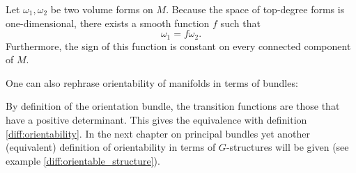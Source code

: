     \begin{property}
        Let $\omega_1,\omega_2$ be two volume forms on $M$. Because the space of top-degree forms is one-dimensional, there exists a smooth function $f$ such that \[\omega_1 = f\omega_2.\] Furthermore, the sign of this function is constant on every connected component of $M$.
    \end{property}

    One can also rephrase orientability of manifolds in terms of bundles:

    \begin{remark}
        By definition of the orientation bundle, the transition functions are those that have a positive determinant. This gives the equivalence with definition \ref{diff:orientability}. In the next chapter on principal bundles yet another (equivalent) definition of orientability in terms of $G$-structures will be given (see example \ref{diff:orientable_structure}).
    \end{remark}

